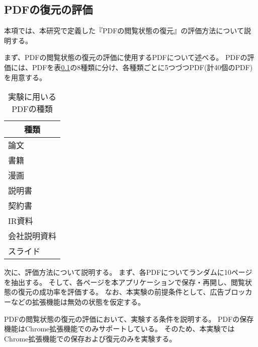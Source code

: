 \subsection{PDFの復元の評価}
本項では、本研究で定義した『PDFの閲覧状態の復元』の評価方法について説明する。

まず、PDFの閲覧状態の復元の評価に使用するPDFについて述べる。
PDFの評価には、PDFを表\ref{}の8種類に分け、各種類ごとに5つづつPDF(計40個のPDF)を用意する。

\begin{table}[htbp]
  \label{tb:evl-pdf-list}
  \caption{実験に用いるPDFの種類}
  \begin{center}
    \begin{tabular}{|l|}
    \hline
    \multicolumn{1}{|c|}{\textbf{種類}} \\\hline
    論文 \\ \hline
    書籍 \\ \hline
    漫画 \\ \hline
    説明書 \\ \hline
    契約書 \\ \hline
    IR資料 \\ \hline
    会社説明資料 \\ \hline
    スライド \\ \hline
    \end{tabular}
  \end{center}
\end{table}

次に、評価方法について説明する。
まず、各PDFについてランダムに10ページを抽出する。
そして、各ページを本アプリケーションで保存・再開し、閲覧状態の復元の成功率を評価する。
なお、本実験の前提条件として、広告ブロッカーなどの拡張機能は無効の状態を仮定する。

PDFの閲覧状態の復元の評価において、実験する条件を説明する。
PDFの保存機能はChrome拡張機能でのみサポートしている。
そのため、本実験ではChrome拡張機能での保存および復元のみを実験する。
